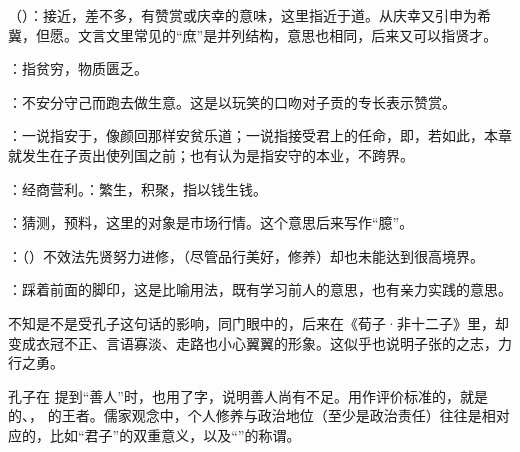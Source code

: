 {
\item {}（）：接近，差不多，有赞赏或庆幸的意味，这里指近于道。从庆幸又引申为希冀，但愿。文言文里常见的“庶”是并列结构，意思也相同，后来又可以指贤才。
\item {}：指贫穷，物质匮乏。
\item {}：不安分守己而跑去做生意。这是以玩笑的口吻对子贡的专长表示赞赏。

：一说指安于，像颜回那样安贫乐道；一说指接受君上的任命，即，若如此，本章就发生在子贡出使列国之前；也有认为是指安守的本业，不跨界。

：经商营利。：繁生，积聚，指以钱生钱。
\item {}：猜测，预料，这里的对象是市场行情。这个意思后来写作“臆”。
}
{}


{
\begin{lyblobitemize}
\item {}：（）不效法先贤努力进修，（尽管品行美好，修养）却也未能达到很高境界。

：踩着前面的脚印，这是比喻用法，既有学习前人的意思，也有亲力实践的意思。

不知是不是受孔子这句话的影响，同门眼中的，后来在《荀子·非十二子》里，却变成衣冠不正、言语寡淡、走路也小心翼翼的形象。这似乎也说明子张的之志，力行之勇。
\end{lyblobitemize}
孔子在   提到“善人”时，也用了字，说明善人尚有不足。用作评价标准的，就是  的、， 的王者。儒家观念中，个人修养与政治地位（至少是政治责任）往往是相对应的，比如“君子”的双重意义，以及“”的称谓。
}
{}


